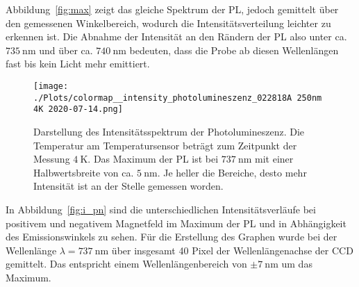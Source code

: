Abbildung~\ref{fig:max} zeigt das gleiche Spektrum der PL, jedoch gemittelt über den gemessenen Winkelbereich, 
wodurch die Intensitätsverteilung leichter zu erkennen ist. 
Die Abnahme der Intensität an den Rändern der PL also unter ca. $\SI{735}{\nano\meter}$ und über ca. 
$\SI{740}{\nano\meter}$ bedeuten, 
dass die Probe ab diesen Wellenlängen fast bis kein Licht mehr emittiert.
\newpage %
\begin{figure}
    \centering
    \texttt{[image: ./Plots/colormap\_\_intensity\_photolumineszenz\_022818A 250nm 4K 2020-07-14.png]}
    \caption{Darstellung des Intensitätsspektrum der Photolumineszenz.
    Die Temperatur  am Temperatursensor beträgt zum Zeitpunkt der Messung $\SI{4}{\kelvin}$. 
    Das Maximum der PL ist bei $\SI{737}{\nano\meter}$ mit einer Halbwertsbreite von ca. $\SI{5}{\nano\meter}$. 
    Je heller die Bereiche, desto mehr Intensität ist an der Stelle gemessen worden.}
    \label{fig:photo}
\end{figure}
\FloatBarrier

In Abbildung~\ref{fig:i_pn} sind die unterschiedlichen Intensitätsverläufe bei positivem und negativem
Magnetfeld im Maximum der PL und in Abhängigkeit des Emissionswinkels zu sehen.
Für die Erstellung des Graphen wurde bei der Wellenlänge $\lambda = \SI{737}{\nano\meter}$ 
über insgesamt 40 Pixel der Wellenlängenachse der CCD gemittelt.
Das entspricht einem Wellenlängenbereich von $\pm \SI{7}{\nano\meter}$ um das Maximum. 

